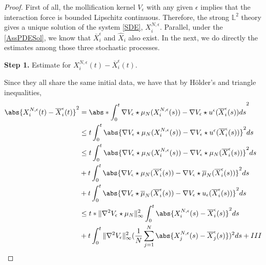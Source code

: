 \begin{proof}
First of all, the mollification kernel $V_\epsilon$ with any given $\epsilon$ implies that the interaction force is  bounded Lipschitz continuous. Therefore, the strong $\mathbb{L}^2$ theory gives a unique solution of the system \autoref{SDE}, $X_i^{N,\epsilon}$. Parallel, under the \autoref{AssPDESol}, we know that $\overline{X}^\epsilon_i$ and $\hat{X}_i$ also exist. In the next, we do directly the estimates among those three stochastic processes. 

{\bf Step 1.} Estimate for $X_i^{N,\epsilon}(t) - \overline{X}_i^{\epsilon}(t) $.

Since they all share the same initial data, we have that by H\"older's and triangle inequalities,
\begin{align*}
  \abs{X_i^{N,\epsilon}(t) - \overline{X}_i^{\epsilon}(t)   }^2 &=  \abs*{\int_0^{t} \nabla V_\epsilon \star  \mu_N(X_{i}^{N,\epsilon}(s) ) - \nabla V_{\epsilon} \star  u^{\epsilon}(\overline{X}_i^{\epsilon}(s)  )  ds }^2\\
                                                                &\le t \int_0^{t} \abs{\nabla V_\epsilon \star  \mu_N(X_{i}^{N,\epsilon}(s) ) - \nabla V_{\epsilon} \star  u^{\epsilon}(\overline{X}_i^{\epsilon}(s)  ) }^2 ds \\
                                                                &\le t \int_0^{t} \abs{\nabla V_{\epsilon} \star  \mu_N(X_i^{N,\epsilon}(s))-\nabla V_{\epsilon} \star \mu_N(\overline{X}_i^{\epsilon}(s)  )  }^2 ds\\
                                                                &+ t \int_0^{t} \abs{\nabla V_\epsilon \star  \mu_N(\overline{X}_i^{\epsilon}(s)) - \nabla V_{\epsilon} \star  \overline{\mu }_N(\overline{X}_i^{\epsilon}(s)  ) }^2 ds \\
                                                                &+ t \int_0^{t} \abs{\nabla V_\epsilon \star  \overline{\mu}_N(\overline{X}_i^{\epsilon}(s)) - \nabla V_{\epsilon} \star  u_{\epsilon}(\overline{X}_i^{\epsilon}(s)   ) }^2 ds \\
                                                                &\le t* \|\nabla^2 V_\epsilon \star  \mu_N\|^2_{\infty}  \int_0^{t}  \abs{X_i^{N,\epsilon}(s)-\overline{X}_i^{\epsilon}(s)   }^2 ds\\
                                                                &+ t \int_0^{t} \|\nabla ^2 V_\epsilon\|^2_{\infty} (\frac{1}{N} \sum_{j=1}^{N} \abs{X_j^{N,\epsilon}(s) - \overline{X}^{\epsilon}_j(s)   })^2 ds + III

\end{align*}
\end{proof}
